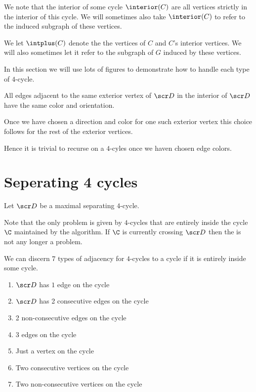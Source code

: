 
\newcommand{\D}{\scr D}


We note that the interior of some cycle $\interior(C)$ are all vertices strictly in the interior of this cycle. We will sometimes also take $\interior(C)$ to refer to the induced subgraph of these vertices.

We let $\intplus(C)$ denote the the vertices of $C$ and $C$'s interior vertices. We will also sometimes let it refer to the subgraph of $G$ induced by these vertices.


In this section we will use lots of figures to demonstrate how to handle each type of $4$-cycle.

All edges adjacent to the same exterior vertex of $\D$ in the interior of $\D$ have the same color and orientation.

Once we have chosen a direction and color for one such exterior vertex this choice follows for the rest of the exterior vertices.

Hence it is trivial to recurse on a $4$-cyles once we haven chosen edge colors.

\section{Seperating 4 cycles}
\thispagestyle{plain}
Let $\D$ be a maximal separating $4$-cycle.

Note that the only problem is given by $4$-cycles that are entirely inside the cycle $\C$ maintained by the algorithm. If $\C$ is currently crossing $\D$ then the is not any longer a problem.

We can discern $7$ types of adjacency for $4$-cycles to a cycle if it is entirely inside some cycle.
\begin{enumerate}
  \renewcommand*{\labelenumi}{(\alph{enumi})}%
  \renewcommand*{\theenumi}{(\alph{enumi})}%

  \item $\D$ has $1$ edge on the cycle
  \label{t:1}
  \item $\D$ has 2 consecutive edges on the cycle
  \label{t:2cons}
  \item 2 non-consecutive edges on the cycle
  \label{t:2alt}
  \item 3 edges on the cycle
  \label{t:3}
  \item Just a vertex on the cycle
  \label{t:v1}
  \item Two consecutive vertices on the cycle
  \label{t:v2cons}
  \item Two non-consecutive vertices on the cycle
  \label{t:v2alt}
\end{enumerate}

